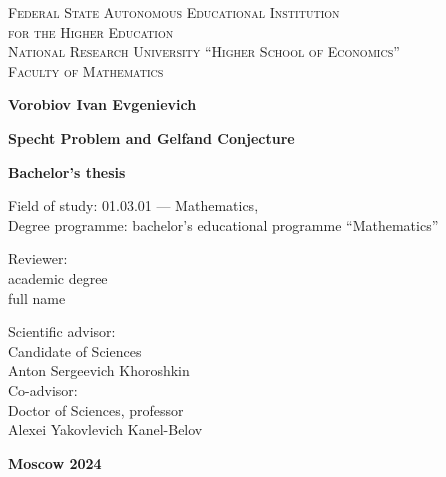 \documentclass[12pt,a4paper]{article}
\begin{document}
    \thispagestyle{empty}

    \begin{center}
    {\scshape Federal State Autonomous Educational Institution\\
    for the Higher Education\\
    National Research University ``Higher School of Economics''\\[1ex]
    Faculty of Mathematics\par}

        \par\vfill

        \textbf{\large Vorobiov Ivan Evgenievich}

        \vspace{1.5cm}

        {\Large\bfseries
        Specht Problem and Gelfand Conjecture\\
        \par}

        \vspace{1.5cm}

        \textbf{\large Bachelor's thesis}


        \vspace{1cm}

        Field of study: 01.03.01 --- Mathematics,\\[1ex]
        Degree programme: bachelor's educational programme ``Mathematics''


        \par\vfill
        \noindent\parbox[t]{0.48\textwidth}{%
            Reviewer:\\[3pt]
            academic degree\\
            full name
        }\hspace{0.04\textwidth}\parbox[t]{0.48\textwidth}{%
            Scientific advisor:\\[3pt]
            Candidate of Sciences\\
            Anton Sergeevich Khoroshkin\\[3pt]
            Co-advisor:\\[3pt]
            Doctor of Sciences, professor\\
            Alexei Yakovlevich Kanel-Belov\\
        }%
        \par\vfill\vfill
        \textbf{Moscow 2024}
    \end{center}
    \thispagestyle{empty}
    \pagebreak
\end{document}
